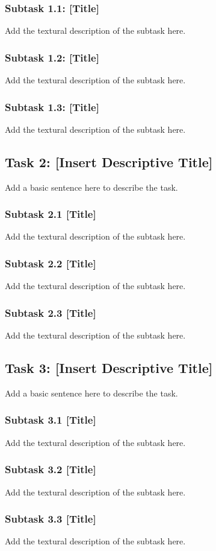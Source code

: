 \documentclass[11pt,letterpaper]{article}
\begin{document}
{\subsubsection*{Subtask 1.1: [Title]}
Add the textural description of the subtask here.
\subsubsection*{Subtask 1.2: [Title]}
Add the textural description of the subtask here.
\subsubsection*{Subtask 1.3: [Title]}
Add the textural description of the subtask here.
\subsection{Task 2: [Insert Descriptive Title]}
Add a basic sentence here to describe the task.
\subsubsection*{Subtask 2.1 [Title]}
Add the textural description of the subtask here.
\subsubsection*{Subtask 2.2 [Title]}
Add the textural description of the subtask here.
\subsubsection*{Subtask 2.3 [Title]}
Add the textural description of the subtask here.
\subsection{Task 3: [Insert Descriptive Title]}
Add a basic sentence here to describe the task.
\subsubsection*{Subtask 3.1 [Title]}
Add the textural description of the subtask here.
\subsubsection*{Subtask 3.2 [Title]}
Add the textural description of the subtask here.
\subsubsection*{Subtask 3.3 [Title]}
Add the textural description of the subtask here.

}
\end{document}
